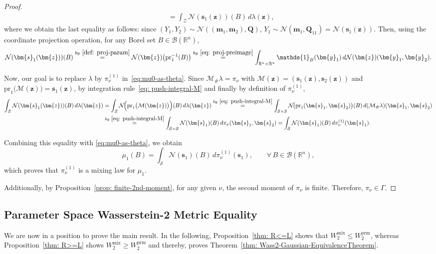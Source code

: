 \documentclass[opre,sglanonrev]{informs4}
\newcommand{\mZ}{\mathcal{Z}}
\newcommand{\mS}{\mathcal{S}}
\newcommand{\mN}{\mathcal{N}}
\newcommand{\mM}{\mathcal{M}}
\newcommand{\mB}{\mathcal{B}}
\newcommand{\mbR}{\mathbb R}
\newcommand{\ind}{\mathds{1}}
\newcommand{\bmean}{\bm{m}}
\newcommand{\bs}{\bm{s}}
\newcommand{\by}{\bm{y}}
\newcommand{\bz}{\bm{z}}
\newcommand{\bQ}{\bm Q}
\begin{document}
\begin{proof}
\begin{align}
   &=
   \int_{\mZ} \mN(\bs_1(\bz))(B)\,d\lambda(\bz), \label{eq:mu0-as-theta}
\end{align}
where we obtain the last equality as follows: since $(Y_1, Y_2) \sim \mN((\bmean_1, \bmean_2), \bQ)$, $ Y_1 \sim \mN(\bmean_1, \bQ_{11}) = \mN(\bs_1(\bz))$. Then, using the coordinate projection operation, for any Borel set $B\in\mB(\mbR^n)$, 
\begin{align*}
  \mN(\bs_1(\bz))(B)
\stackrel{by~\eqref{def: proj-param}}{=}\mN(\bz)\bigl(\mathrm{pr}_1^{-1}(B)\bigr) 
\stackrel{by~\eqref{eq: proj-preimage}}{=}\int_{\mbR^n\times\mbR^n}\ind_B(\by_1)\,d\mN(\bz)(\by_1,\by_2).  
\end{align*}



Now, our goal is to replace $\lambda$ by $\pi_\nu^{(1)}$ in~\eqref{eq:mu0-as-theta}. Since $\mathcal{M}_{\#}\lambda = \pi_\nu$ with $\mathcal{M}(\bz) = (\bs_1(\bz),\bs_2(\bz))$ and $\mathrm{pr}_1\bigl(\mM(\bz)\bigr) = \bs_1(\bz)$, by integration rule~\eqref{eq: push-integral-M} and finally by definition of $\pi_\nu^{(1)}$,
\begin{align*}
\int_{\mZ} \mN(\bs_1(\bz))(B)\,d\lambda(\bz)
& \stackrel{}{=} \int_{\mZ} \mN\!\Bigl(\mathrm{pr}_1\bigl(\mM(\bz)\bigr)\Bigr)(B)\,d\lambda(\bz) \stackrel{by~\eqref{eq: push-integral-M}}{=}  \int_{\mS\times\mS} \mN\!\bigl(\mathrm{pr}_1(\bs_1,\bs_2)\bigr)(B)\,d(\mM_\#\lambda)(\bs_1,\bs_2) \\
& \stackrel{by~\eqref{eq: push-integral-M}}{\;=\;}\int_{\mS\times\mS} \mN(\bs_1)(B)\,d\pi_\nu(\bs_1,\bs_2) = \int_{\mS} \mN(\bs_1)(B)\,d\pi_\nu^{(1)}(\bs_1).
\end{align*}


Combining this equality with \eqref{eq:mu0-as-theta}, we obtain
\[
   \mu_1(B)
   =
   \int_{\mathcal{S}} \mN(\bs_1)(B)\,d\pi_\nu^{(1)}(\bs_1),
   \qquad \forall\,B \in \mathcal{B}(\mbR^n),
\]
which proves that $\pi_\nu^{(1)}$ is a mixing law for $\mu_1$.

Additionally, by Proposition~\ref{prop: finite-2nd-moment}, for any given $\nu$, the second moment of $\pi_\nu$ is finite. Therefore, $\pi_\nu \in \Gamma$.
\end{proof}

\subsection{Parameter Space Wasserstein-2 Metric Equality}
We are now in a position to prove the main result. In the following, Proposition~\ref{thm: R<=L} shows that $W_2^\mathrm{mix} \leq W_2^\mathrm{prm}$, whereas Proposition~\ref{thm: R>=L} shows $W_2^\mathrm{mix} \geq W_2^\mathrm{prm}$ and thereby, proves Theorem~\ref{thm: Wass2-Gaussian-EquivalenceTheorem}.
\end{document}
